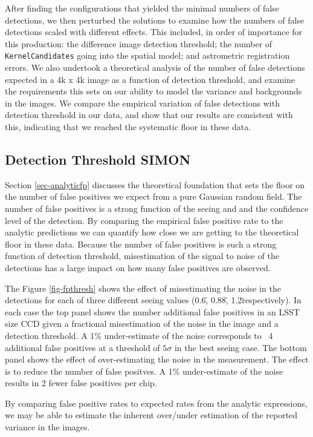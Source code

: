 \documentclass[prd, nofootinbib, floatfix, 11pt,tightenlines,times]{article}
\begin{document}
After finding the configurations that yielded the minimal numbers of
false detections, we then perturbed the solutions to examine how the
numbers of false detections scaled with different effects.  This
included, in order of importance for this production: the difference
image detection threshold; the number of {\tt KernelCandidates} going
into the spatial model; and astrometric registration errors.  We also
undertook a theoretical analysis of the number of false detections
expected in a 4k x 4k image as a function of detection threshold, and
examine the requirements this sets on our ability to model the
variance and backgrounds in the images.  We compare the empirical
variation of false detections with detection threshold in our data,
and show that our results are consistent with this, indicating that we
reached the systematic floor in these data.

\subsection{Detection Threshold {\bf SIMON}}

Section \ref{sec-analyticfp} discusses the theoretical foundation 
that sets the floor on the number of false positives we expect from a 
pure Gaussian random field.  The number of false positives is a strong
function of the seeing and and the confidence level of the detection.  
By comparing the empirical false positive rate to the analytic predictions
we can quantify how close we are getting to the theoretical floor in these
data.  Because the number of false positives is such a strong function of
detection threshold, misestimation of the signal to noise of the detections
has a large impact on how many false positives are observed.  

The Figure \ref{fig-fpthresh} shows the 
effect of misestimating the noise in the detections for each of three different
seeing values (0.6\", 0.88\", 1.2\" respectively).  In each case the top panel shows
the number additional false positives in an LSST size CCD given a fractional misestimation
of the noise in the image and a detection threshold.  A 1\% under-estimate of the noise
corresponds to ~4 additional false positives at a threshold of $5\sigma$ in the best seeing case.  
The bottom panel shows 
the effect of over-estimating the noise in the measurement.  The effect is to reduce
the number of false positves.  A 1\% under-estimate of the noise results in 2 fewer false positives
per chip.

By comparing false positive rates to expected rates from the analytic expressions, we may be able to
estimate the inherent over/under estimation of the reported variance in the images.
\end{document}
